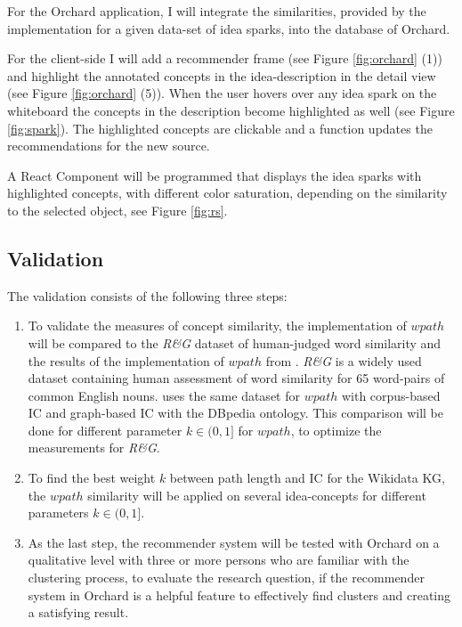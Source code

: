 \documentclass[pdftex,a4paper,12pt]{scrartcl}
\theoremstyle{definition}
\begin{document}
    For the Orchard application, I will integrate the similarities, provided by the implementation for a given data-set of idea sparks, into the database of Orchard. 

    For the client-side I will add a recommender frame (see Figure \ref{fig:orchard} (1)) and highlight the annotated concepts in the idea-description in the detail view (see Figure \ref{fig:orchard} (5)). When the user hovers over any idea spark on the whiteboard the concepts in the description become highlighted as well (see Figure \ref{fig:spark}). The highlighted concepts are clickable and a function updates the recommendations for the new source. 

    A React Component will be programmed that displays the idea sparks with highlighted concepts, with different color saturation, depending on the similarity to the selected object, see Figure \ref{fig:rs}.
    
    \subsection{Validation}
    The validation consists of the following three steps:  
    \begin{enumerate}
        \item To validate the measures of concept similarity, the implementation of $wpath$ will be compared to the \textit{R\&G} dataset \citep{rubenstein_contextual_1965} of human-judged word similarity and the results of the implementation of $wpath$ from \citet{zhu_computing_2017}. \textit{R\&G} is a widely used dataset containing human assessment of word similarity for 65 word-pairs of common English nouns.
        \citet{zhu_computing_2017} uses the same dataset for $wpath$ with corpus-based IC and graph-based IC with the DBpedia ontology. This comparison will be done for different parameter $k \in (0,1]$ for $wpath$, to optimize the measurements for \textit{R\&G}. 
        \item To find the best weight $k$ between path length and IC for the Wikidata KG, the $wpath$ similarity will be applied on several idea-concepts for different parameters $k \in (0,1]$.
        \item  As the last step, the recommender system will be tested with Orchard on a qualitative level with three or more persons who are familiar with the clustering process, to evaluate the research question, if the recommender system in Orchard is a helpful feature to effectively find clusters and creating a satisfying result. 
    \end{enumerate}
    
\end{document}

